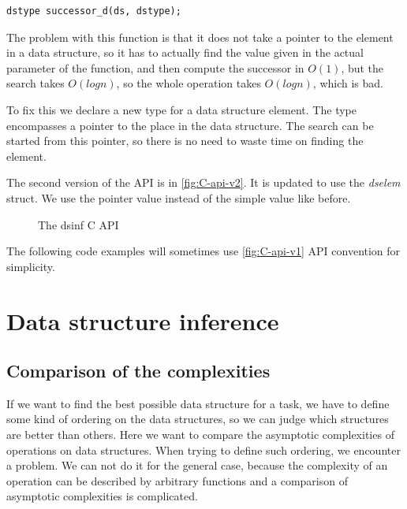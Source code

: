 \documentclass[a4paper,11pt]{article}
\begin{document}
        \begin{lstlisting}
dstype successor_d(ds, dstype);
        \end{lstlisting}

        The problem with this function is that it does not take a pointer to the element in a data structure, so it has
        to actually find the value given in the actual parameter of the function, and then compute the successor in
        $O(1)$, but the search takes $O(log n)$, so the whole operation takes $O(log n)$, which is bad.

        To fix this we declare a new type for a data structure element. The type encompasses a pointer to the place in
        the data structure. The search can be started from this pointer, so there is no need to waste time on finding the element.

        The second version of the API is in \autoref{fig:C-api-v2}. It is updated to use the \emph{dselem} struct. We use the pointer value instead of the simple value like before.

        \begin{figure}[h!]
            
            \caption{The dsinf C API}

            \label{fig:C-api-v2}
        \end{figure}

        The following code examples will sometimes use \autoref{fig:C-api-v1} API convention for simplicity.

\section{Data structure inference}

	\subsection{Comparison of the complexities}

		If we want to find the best possible data structure for a task, we have to define some kind of ordering
		on the data structures, so we can judge which structures are better than others. Here we want to compare the
		asymptotic complexities of operations on data structures. When trying to define such ordering, we
		encounter a problem.  We can not do it for the general case, because the complexity of an operation
        can be described by arbitrary functions and a comparison of asymptotic complexities is complicated.
\end{document}
